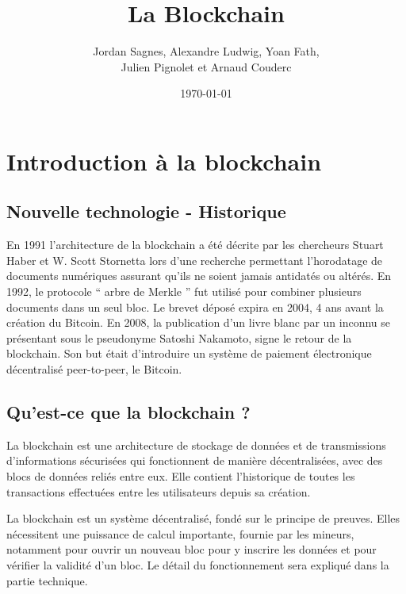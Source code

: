 \documentclass[12pt, a4paper, oneside]{book}
\title{La Blockchain}
\author{ Jordan Sagnes, Alexandre Ludwig, Yoan Fath, \\ Julien Pignolet et Arnaud Couderc}
\date{\today}
\begin{document}
\maketitle
 
    \frontmatter
    
    
    \tableofcontents
    \thispagestyle{empty}
    \mainmatter

    \chapter{Introduction à la blockchain}
    \section{Nouvelle technologie - Historique}
    En 1991 l’architecture de la blockchain a été décrite par les chercheurs Stuart Haber et W. Scott Stornetta lors d’une recherche permettant l’horodatage de documents numériques assurant qu’ils ne soient jamais antidatés ou altérés. 
En 1992, le protocole \hyphenquote{french}{ arbre de Merkle } fut utilisé pour combiner plusieurs documents dans un seul bloc. 
Le brevet déposé expira en 2004, 4 ans avant la création du Bitcoin.
En 2008, la publication d’un livre blanc par un inconnu se présentant sous le pseudonyme Satoshi Nakamoto, signe le retour de la blockchain. Son but était d’introduire un système de paiement électronique décentralisé peer-to-peer, le Bitcoin.
    \section{Qu'est-ce que la blockchain ?}
    La blockchain est une architecture de stockage de données et de transmissions d’informations sécurisées qui fonctionnent de manière décentralisées, avec des blocs de données reliés entre eux. Elle contient l’historique de toutes les transactions effectuées entre les utilisateurs depuis sa création. 

La blockchain est un système décentralisé, fondé sur le principe de preuves. Elles nécessitent une puissance de calcul importante, fournie par les mineurs, notamment pour ouvrir un nouveau bloc pour y inscrire les données et pour vérifier la validité d’un bloc. Le détail du fonctionnement sera expliqué dans la partie technique.
\end{document}
